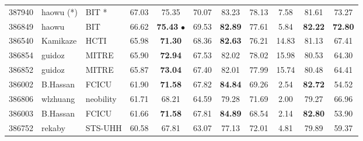 \documentclass[11pt,a4paper]{article}
\begin{document}
\begin{table*}[htp!!]
\begin{center}
\begin{tabu}{|HHl| *{8}{S[table-format=2.2]|}}
387940 & haowu (*) & BIT \cite{wu-EtAl:2017:SemEval1}* & 67.03 & 75.35 & 70.07 & 83.23 & 78.13 & 7.58 & 81.61 & 73.27\\ 

386849 & haowu & BIT \cite{wu-EtAl:2017:SemEval1} & 66.62 & {\bf 75.43} $\bullet$ & 69.53 & {\bf 82.89}\hspace{0.55em} & 77.61 & 5.84 & {\bf 82.22}\hspace{0.55em} & {\bf 72.80}\hspace{0.55em}\\ 

386540 & Kamikaze & HCTI \cite{shao:2017:SemEval} & 65.98 & {\bf 71.30}\hspace{0.55em} & 68.36 & {\bf 82.63}\hspace{0.55em} & 76.21 & 14.83 & 81.13 & 67.41\\ 

386854 & guidoz & MITRE \cite{henderson-EtAl:2017:SemEval} & 65.90 & {\bf 72.94}\hspace{0.55em} & 67.53 & 82.02 & 78.02 & 15.98 & 80.53 & 64.30\\ 

386852 & guidoz & MITRE \cite{henderson-EtAl:2017:SemEval} & 65.87 & {\bf 73.04}\hspace{0.55em} & 67.40 & 82.01 & 77.99 & 15.74 & 80.48 & 64.41\\ 

386002 & B.Hassan & FCICU \cite{hassan-EtAl:2017:SemEval} & 61.90 & {\bf 71.58}\hspace{0.55em} & 67.82 & {\bf 84.84}\hspace{0.55em} & 69.26 & 2.54 & {\bf 82.72}\hspace{0.55em} & 54.52\\ 

386806 & wlzhuang & neobility \cite{zhuang-chang:2017:SemEval} & 61.71 & 68.21 & 64.59 & 79.28 & 71.69 & 2.00 & 79.27 & 66.96\\ 

386003 & B.Hassan & FCICU \cite{hassan-EtAl:2017:SemEval} & 61.66 & {\bf 71.58}\hspace{0.55em} & 67.81 & {\bf 84.89}\hspace{0.55em} & 68.54 & 2.14 & {\bf 82.80}\hspace{0.55em} & 53.90\\ 

386752 & rekaby & STS-UHH \cite{kohail-salama-biemann:2017:SemEval} & 60.58 & 67.81 & 63.07 & 77.13 & 72.01 & 4.81 & 79.89 & 59.37\\ 


\end{tabu}
\end{center}
\end{table*}
\end{document}
